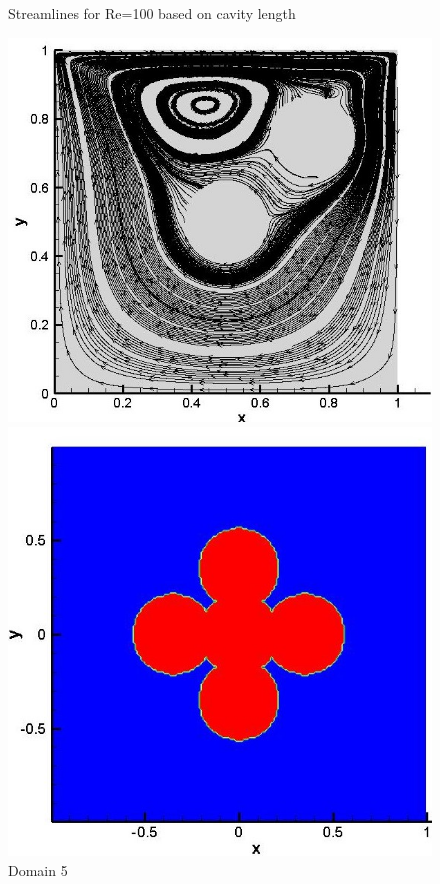 \documentclass[12pt]{elsarticle}
\begin{document}
	\begin{figure}[h]
		\caption{Streamlines for Re=100 based on cavity length}
		\centering\includegraphics[width=0.7\linewidth]{58_immerssed_boundary_streamlines}
		\caption{Domain 5}
		\centering\includegraphics[width=0.7\linewidth]{59_immerssed_boundary_umag}
	\end{figure}
	
\end{document}
